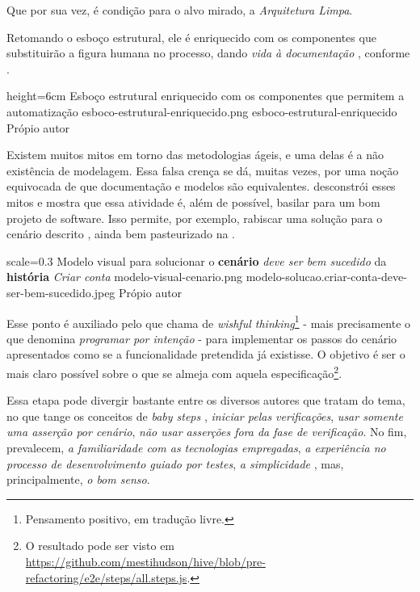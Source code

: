   Que por sua vez, é condição para o alvo mirado, a \emph{Arquitetura Limpa}.

  Retomando o esboço estrutural, ele é enriquecido com os componentes que substituirão a figura humana no processo, dando \emph{vida à documentação} \cite[pág. 29, tradução nossa]{Adzic2011}, conforme .

  \imagem
    {height=6cm}
    {Esboço estrutural enriquecido com os componentes que permitem a automatização}
    {esboco-estrutural-enriquecido.png}
    {esboco-estrutural-enriquecido}
    {Própio autor}

  Existem muitos mitos em torno das metodologias ágeis, e uma delas é a não existência de modelagem. Essa falsa crença se dá, muitas vezes, por uma noção equivocada de que documentação e modelos são equivalentes.  desconstrói esses mitos e mostra que essa atividade é, além de possível, basilar para um bom projeto de software. Isso permite, por exemplo, rabiscar uma solução para o cenário descrito \cite[pág. 57]{Ruby2011}, ainda bem pasteurizado na .

  \imagem
    {scale=0.3}
    {Modelo visual para solucionar o \textbf{cenário} \emph{deve ser bem sucedido} da \textbf{história} \emph{Criar conta}}
    {modelo-visual-cenario.png}
    {modelo-solucao.criar-conta-deve-ser-bem-sucedido.jpeg}
    {Própio autor\footnotemark}

  Esse ponto é auxiliado pelo que  chama de \emph{wishful thinking}\footnote{Pensamento positivo, em tradução livre.} - mais precisamente o que  denomina \emph{programar por intenção} - para implementar os passos do cenário apresentados como se a funcionalidade pretendida já existisse. O objetivo é ser o mais claro possível sobre o que se almeja com aquela especificação\footnote{O resultado pode ser visto em \url{https://github.com/mestihudson/hive/blob/pre-refactoring/e2e/steps/all.steps.js}.}.

  Essa etapa pode divergir bastante entre os diversos autores que tratam do tema, no que tange os conceitos de \emph{baby steps} \cite[pág. 1]{Aniche2011}, \emph{iniciar pelas verificações}, \emph{usar somente uma asserção por cenário}, \emph{não usar asserções fora da fase de verificação}. No fim, prevalecem, \emph{a familiaridade com as tecnologias empregadas}, \emph{a experiência no processo de desenvolvimento guiado por testes}, \emph{a simplicidade} \cite[pág. xii]{Beck2003}, mas, principalmente, \emph{o bom senso}.

